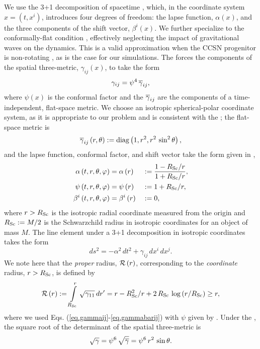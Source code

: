 We use the 3+1 decomposition of spacetime
\citep[see, e.g.,][for details]{bfi1997,g2012,rz2013},
which, in the coordinate system
$x=\left(t,x^{i}\right)$,
introduces four degrees of freedom:
the lapse function, $\alpha\left(x\right)$,
and the three components of the shift vector,
$\beta^{i}\left(x\right)$.
We further specialize to the conformally-flat condition
\citep[\cfc{},][]{wmm1996},
effectively neglecting the impact of gravitational waves on
the dynamics.
This is a valid approximation when the CCSN progenitor is non-rotating
\citep{dnf2005}, as is the case for our simulations.
The \cfc{} forces the components of the
spatial three-metric, $\gamma_{ij}\left(x\right)$,
to take the form
\begin{equation}
  \gamma_{ij}
  =\psi^{4}\,\overline{\gamma}_{ij},
  \label{eq.gammaij}
\end{equation}
where $\psi\left(x\right)$ is the conformal factor
and the $\overline{\gamma}_{ij}$ are the components of a time-independent,
flat-space metric.
We choose an isotropic spherical-polar coordinate system,
as it is appropriate to our problem and is consistent with the \cfc;
the flat-space metric is
\begin{equation}
  \overline{\gamma}_{ij}\left(r,\theta\right)
  :=\mathrm{diag}\left(1,r^{2},r^{2}\,\sin^{2}\theta\right),
  \label{eq.gammabarij}
\end{equation}
and the lapse function, conformal factor, and shift vector
take the form given in \citet{bs2010},
\begin{alignat}{2}
  \alpha   \left(t,r,\theta,\varphi\right)&=\alpha   \left(r\right)
    &&:=\frac{1-R_{\mathrm{Sc}}/r}{1+R_{\mathrm{Sc}}/r},\\
  \psi     \left(t,r,\theta,\varphi\right)&=\psi     \left(r\right)
    &&:=1+R_{\mathrm{Sc}}/r,\label{eq.psi}\\
  \beta^{i}\left(t,r,\theta,\varphi\right)&=\beta^{i}\left(r\right)
    &&:=0,
\end{alignat}
where $r>R_{\mathrm{Sc}}$ is the isotropic radial coordinate measured from the
origin and $R_{\mathrm{Sc}}:=M/2$ is the Schwarzchild radius in
isotropic coordinates for an object of mass $M$.
The line element under a 3+1 decomposition in
isotropic coordinates takes the form
\begin{equation}
  ds^{2}=-\alpha^{2}\,dt^{2}+\gamma_{ij}\,dx^{i}\,dx^{j}.
  \label{eq.ds2}
\end{equation}
We note here that the {\sl proper} radius, $\mathcal{R}\left(r\right)$,
corresponding to the {\sl coordinate} radius, $r>R_{\mathrm{Sc}}$, is defined by
\begin{equation}
  \mathcal{R}\left(r\right)
  :=\int\limits_{R_{\mathrm{Sc}}}^{r}\sqrt{\gamma_{11}}\,
  dr'
  =r-R_{\mathrm{Sc}}^{2}/r+2\,R_{\mathrm{Sc}}\,\log\left(r/R_{\mathrm{Sc}}\right)\geq r,
  \label{eq.properDistance}
\end{equation}
where we used Eqs. (\ref{eq.gammaij}-\ref{eq.gammabarij})
with $\psi$ given by .
Under the \cfc{}, the square root of the determinant of the spatial
three-metric is
\begin{equation}
    \sqrt{\gamma}=\psi^{6}\,\sqrt{\overline{\gamma}}=\psi^{6}\,r^{2}\,\sin\theta.
\end{equation}

